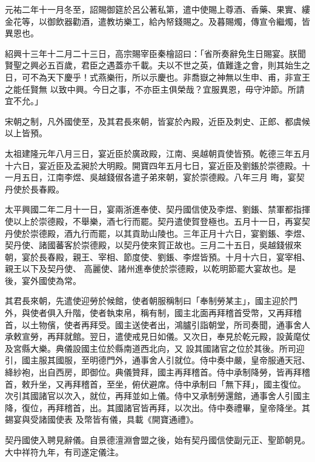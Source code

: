 \begin{pinyinscope}
 元祐二年十一月冬至，詔賜御筵於呂公著私第，遣中使賜上尊酒、香藥、果實、縷金花等，以御飲器勸酒，遣教坊樂工，給內帑錢賜之。及暮賜燭，傳宣令繼燭，皆異恩也。



 紹興十三年十二月二十三日，高宗賜宰臣秦檜詔曰：「省所奏辭免生日賜宴。朕聞賢聖之興必五百歲，君臣之遇蓋亦千載。夫以不世之英，值難逢之會，則其始生之日，可不為天下慶乎！式燕樂衎，所以示慶也。非喬嶽之神無以生申、甫，非宣王之能任賢無
 以致中興。今日之事，不亦臣主俱榮哉？宜服異恩，毋守沖節。所請宜不允。」



 宋朝之制，凡外國使至，及其君長來朝，皆宴於內殿，近臣及刺史、正郎、都虞候以上皆預。



 太祖建隆元年八月三日，宴近臣於廣政殿，江南、吳越朝貢使皆預。乾德三年五月十六日，宴近臣及孟昶於大明殿。開寶四年五月七日，宴近臣及劉鋹於崇德殿。十一月五日，江南李煜、吳越錢俶各遣子弟來朝，宴於崇德殿。八年三月
 晦，宴契丹使於長春殿。



 太平興國二年二月十一日，宴兩浙進奉使、契丹國信使及李煜、劉鋹、禁軍都指揮使以上於崇德殿，不舉樂，酒七行而罷。契丹遣使賀登極也。五月十一日，再宴契丹使於崇德殿，酒九行而罷，以其貢助山陵也。三年正月十六日，宴劉鋹、李煜、契丹使、諸國蕃客於崇德殿，以契丹使來賀正故也。三月二十五日，吳越錢俶來朝，宴於長春殿，親王、宰相、節度使、劉鋹、李煜皆預。十月十六日，宴宰相、親王以下及契丹使、
 高麗使、諸州進奉使於崇德殿，以乾明節罷大宴故也。是後，宴外國使為常。



 其君長來朝，先遣使迎勞於候館，使者朝服稱制曰「奉制勞某主」，國主迎於門外，與使者俱入升階，使者執束帛，稱有制，國主北面再拜稽首受幣，又再拜稽首，以土物儐，使者再拜受。國主送使者出，鴻臚引詣朝堂，所司奏聞，通事舍人承敕宣勞，再拜就館。翌日，遣使戒見日如儀。又次日，奉見於乾元殿，設黃麾仗及宮縣大樂。典儀設國主位於縣南道西北向，又
 設其國諸官之位於其後。所司迎引，國主服其國服，至明德門外，通事舍人引就位。侍中奏中嚴，皇帝服通天冠、絳紗袍，出自西房，即御位。典儀贊拜，國主再拜稽首。侍中承制降勞，皆再拜稽首，敕升坐，又再拜稽首，至坐，俯伏避席。侍中承制曰「無下拜」，國主復位。次引其國諸官以次入，就位，再拜並如上儀。侍中又承制勞還館，通事舍人引國主降，復位，再拜稽首，出。其國諸官皆再拜，以次出。侍中奏禮畢，皇帝降坐。其錫宴與受諸國使表
 及幣皆有儀，具載《開寶通禮》。



 契丹國使入聘見辭儀。自景德澶淵會盟之後，始有契丹國信使副元正、聖節朝見。大中祥符九年，有司遂定儀注。




\end{pinyinscope}
